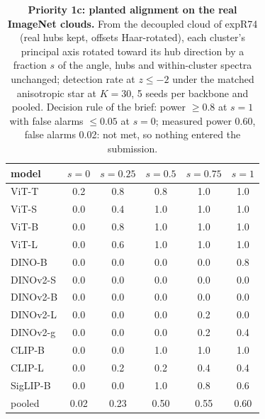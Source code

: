 \documentclass{article}
\theoremstyle{inline}
\theoremstyle{inlineit}
\begin{document}
\begin{table}[tbp]
\centering
\footnotesize
\setlength{\tabcolsep}{6pt}
\begin{tabular}{lccccc}
\toprule
model & $s{=}0$ & $s{=}0.25$ & $s{=}0.5$ & $s{=}0.75$ & $s{=}1$ \\
\midrule
ViT-T & 0.2 & 0.8 & 0.8 & 1.0 & 1.0 \\
ViT-S & 0.0 & 0.4 & 1.0 & 1.0 & 1.0 \\
ViT-B & 0.0 & 0.8 & 1.0 & 1.0 & 1.0 \\
ViT-L & 0.0 & 0.6 & 1.0 & 1.0 & 1.0 \\
DINO-B & 0.0 & 0.0 & 0.0 & 0.0 & 0.8 \\
DINOv2-S & 0.0 & 0.0 & 0.0 & 0.0 & 0.0 \\
DINOv2-B & 0.0 & 0.0 & 0.0 & 0.0 & 0.0 \\
DINOv2-L & 0.0 & 0.0 & 0.0 & 0.2 & 0.0 \\
DINOv2-g & 0.0 & 0.0 & 0.0 & 0.2 & 0.4 \\
CLIP-B & 0.0 & 0.0 & 1.0 & 1.0 & 1.0 \\
CLIP-L & 0.0 & 0.2 & 0.2 & 0.4 & 0.4 \\
SigLIP-B & 0.0 & 0.0 & 1.0 & 0.8 & 0.6 \\
\midrule pooled & 0.02 & 0.23 & 0.50 & 0.55 & 0.60 \\
\bottomrule
\end{tabular}
\caption{\textbf{Priority 1c: planted alignment on the real ImageNet clouds.} From the decoupled cloud of expR74 (real hubs kept, offsets Haar-rotated), each cluster's principal axis rotated toward its hub direction by a fraction $s$ of the angle, hubs and within-cluster spectra unchanged; detection rate at $z\le-2$ under the matched anisotropic star at $K{=}30$, 5 seeds per backbone and pooled. Decision rule of the brief: power $\ge 0.8$ at $s{=}1$ with false alarms $\le 0.05$ at $s{=}0$; measured power 0.60, false alarms 0.02: not met, so nothing entered the submission. %
}
\label{tab:r1c-implant}
\end{table}
\end{document}
